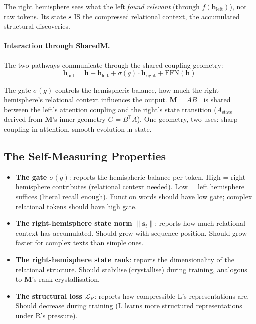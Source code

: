 \documentclass[11pt, a4paper]{article}
\newcommand{\M}{\mathbf{M}}
\newcommand{\h}{\mathbf{h}}
\theoremstyle{plain}
\theoremstyle{definition}
\theoremstyle{remark}
\begin{document}
The right hemisphere sees what the left \emph{found relevant} (through $f(\h_{\mathrm{left}})$), not raw tokens.
Its state $\mathbf{s}$ IS the compressed relational context, the accumulated structural discoveries.

\paragraph{Interaction through SharedM.}
The two pathways communicate through the shared coupling geometry:
\begin{equation}
\h_{\mathrm{out}} = \h + \h_{\mathrm{left}} + \sigma(g) \cdot \h_{\mathrm{right}} + \mathrm{FFN}(\h)
\end{equation}

The gate $\sigma(g)$ controls the hemispheric balance, how much the right hemisphere's relational context influences the output.
$\M = AB^\top$ is shared between the left's attention coupling and the right's state transition ($A_{\mathrm{state}}$ derived from $\M$'s inner geometry $G = B^\top A$).
One geometry, two uses: sharp coupling in attention, smooth evolution in state.

\subsection{The Self-Measuring Properties}

\begin{itemize}[nosep]
\item \textbf{The gate $\sigma(g)$}: reports the hemispheric balance per token. High = right hemisphere contributes (relational context needed). Low = left hemisphere suffices (literal recall enough). Function words should have low gate; complex relational tokens should have high gate.
\item \textbf{The right-hemisphere state norm $\|\mathbf{s}_t\|$}: reports how much relational context has accumulated. Should grow with sequence position. Should grow faster for complex texts than simple ones.
\item \textbf{The right-hemisphere state rank}: reports the dimensionality of the relational structure. Should stabilise (crystallise) during training, analogous to $\M$'s rank crystallisation.
\item \textbf{The structural loss $\mathcal{L}_R$}: reports how compressible L's representations are. Should decrease during training (L learns more structured representations under R's pressure).
\end{itemize}
\end{document}
